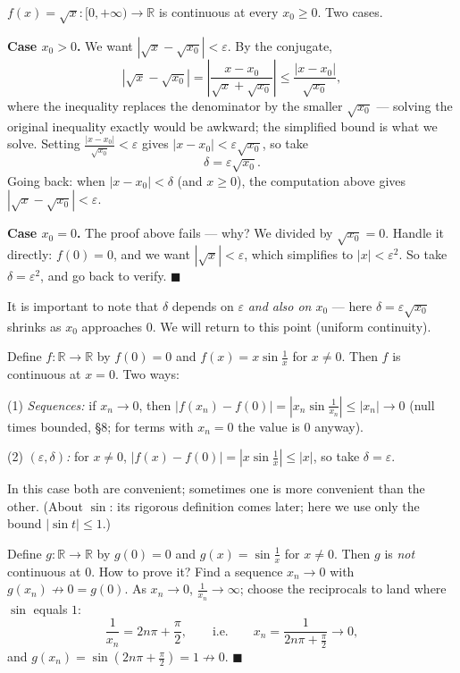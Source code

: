 \documentclass[11pt]{report}
\begin{document}
\begin{exbox}
$f(x) = \sqrt{x}: [0,+\infty) \to \mathbb{R}$ is continuous at every $x_0 \geq 0$. Two cases.

\textbf{Case $x_0 > 0$.} We want $|\sqrt x - \sqrt{x_0}| < \varepsilon$. By the conjugate,
\[
|\sqrt x - \sqrt{x_0}| = \left| \frac{x - x_0}{\sqrt x + \sqrt{x_0}} \right| \leq \frac{|x - x_0|}{\sqrt{x_0}},
\]
where the inequality replaces the denominator by the smaller $\sqrt{x_0}$ --- solving the original inequality exactly would be awkward; the simplified bound is what we solve. Setting $\tfrac{|x-x_0|}{\sqrt{x_0}} < \varepsilon$ gives $|x - x_0| < \varepsilon \sqrt{x_0}$, so take
\[
\delta = \varepsilon \sqrt{x_0}.
\]
Going back: when $|x - x_0| < \delta$ (and $x \geq 0$), the computation above gives $|\sqrt x - \sqrt{x_0}| < \varepsilon$.

\textbf{Case $x_0 = 0$.} The proof above fails --- why? We divided by $\sqrt{x_0} = 0$. Handle it directly: $f(0) = 0$, and we want $|\sqrt x| < \varepsilon$, which simplifies to $|x| < \varepsilon^2$. So take $\delta = \varepsilon^2$, and go back to verify. \hfill $\blacksquare$

It is important to note that $\delta$ depends on $\varepsilon$ \emph{and also on $x_0$} --- here $\delta = \varepsilon\sqrt{x_0}$ shrinks as $x_0$ approaches $0$. We will return to this point (uniform continuity).
\end{exbox}

\begin{exbox}
Define $f: \mathbb{R} \to \mathbb{R}$ by $f(0) = 0$ and $f(x) = x \sin \tfrac1x$ for $x \neq 0$. Then $f$ is continuous at $x = 0$. Two ways:

(1) \emph{Sequences:} if $x_n \to 0$, then $|f(x_n) - f(0)| = |x_n \sin\tfrac{1}{x_n}| \leq |x_n| \to 0$ (null times bounded, \S 8; for terms with $x_n=0$ the value is $0$ anyway).

(2) \emph{$(\varepsilon,\delta)$:} for $x \neq 0$, $|f(x) - f(0)| = |x \sin\tfrac1x| \leq |x|$, so take $\delta = \varepsilon$.

In this case both are convenient; sometimes one is more convenient than the other. (About $\sin$: its rigorous definition comes later; here we use only the bound $|\sin t| \leq 1$.)
\end{exbox}

\begin{exbox}
Define $g: \mathbb{R} \to \mathbb{R}$ by $g(0) = 0$ and $g(x) = \sin\tfrac1x$ for $x \neq 0$. Then $g$ is \emph{not} continuous at $0$. How to prove it? Find a sequence $x_n \to 0$ with $g(x_n) \not\to 0 = g(0)$. As $x_n \to 0$, $\tfrac{1}{x_n} \to \infty$; choose the reciprocals to land where $\sin$ equals $1$:
\[
\frac{1}{x_n} = 2n\pi + \frac\pi2, \qquad \text{i.e.} \qquad x_n = \frac{1}{2n\pi + \tfrac\pi2} \longrightarrow 0,
\]
and $g(x_n) = \sin\left(2n\pi + \tfrac\pi2\right) = 1 \not\to 0$. \hfill $\blacksquare$
\end{exbox}
\end{document}
